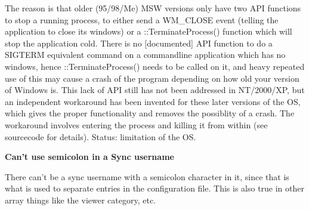 \begin{helponly}
The reason is that older (95/98/Me) MSW versions only have two API functions to
stop a running process, to either send a WM\_CLOSE event (telling the application
to close its windows) or a ::TerminateProcess() function which will stop the
application cold. There is no [documented] API function to do a SIGTERM
equivalent command on a commandline application which has no windows, hence
::TerminateProcess() needs to be called on it, and heavy repeated use of this may
cause a crash of the program depending on how old your version of Windows is.
This lack of API still has not been addressed in NT/2000/XP, but an independent
workaround has been invented for these later versions of the OS, which gives the
proper functionality and removes the possiblity of a crash. The workaround
involves entering the process and killing it from within (see sourcecode for
details). Status: limitation of the OS.

\bf{Can't use semicolon in a Sync username}

There can't be a sync username with a semicolon character in it, since that is
what is used to separate entries in the configuration file.
This is also true in other array things like the viewer category, etc.

\end{helponly}

